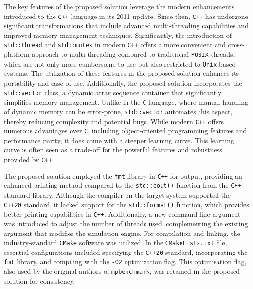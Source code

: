 The key features of the proposed solution leverage the modern enhancements introduced to the \texttt{C++} language in its 2011 update. Since then, \texttt{C++} has undergone significant transformations that include advanced multi-threading capabilities and improved memory management techniques. Significantly, the introduction of \texttt{std::thread} and \texttt{std::mutex} in modern \texttt{C++} offers a more convenient and cross-platform approach to multi-threading compared to traditional \texttt{POSIX} threads, which are not only more cumbersome to use but also restricted to \texttt{Unix}-based systems. The utilization of these features in the proposed solution enhances its portability and ease of use. Additionally, the proposed solution incorporates the \texttt{std::vector} class, a dynamic array sequence container that significantly simplifies memory management. Unlike in the \texttt{C} language, where manual handling of dynamic memory can be error-prone, \texttt{std::vector} automates this aspect, thereby reducing complexity and potential bugs. While modern \texttt{C++} offers numerous advantages over \texttt{C}, including object-oriented programming features and performance parity, it does come with a steeper learning curve. This learning curve is often seen as a trade-off for the powerful features and robustness provided by \texttt{C++}\cite{evolution_of_C++}.

The proposed solution employed the \texttt{fmt} library in \texttt{C++}\cite{fmt_printing_library} for output, providing an enhanced printing method compared to the \texttt{std::cout()} function from the \texttt{C++} standard library. Although the compiler on the target system supported the \texttt{C++20} standard, it lacked support for the \texttt{std::format()} function, which provides better printing capabilities in \texttt{C++}\cite{std_format_gcc_compiler_version}. Additionally, a new command line argument was introduced to adjust the number of threads used, complementing the existing argument that modifies the simulation engine. For compilation and linking, the industry-standard \texttt{CMake}\cite{cmake_about} software was utilized. In the \texttt{CMakeLists.txt} file, essential configurations included specifying the \texttt{C++20} standard, incorporating the \texttt{fmt} library, and compiling with the \texttt{-O2} optimization flag. This optimisation flag, also used by the original authors of \texttt{mpbenchmark}\cite{mpbenchmark_paper}, was retained in the proposed solution for consistency.

